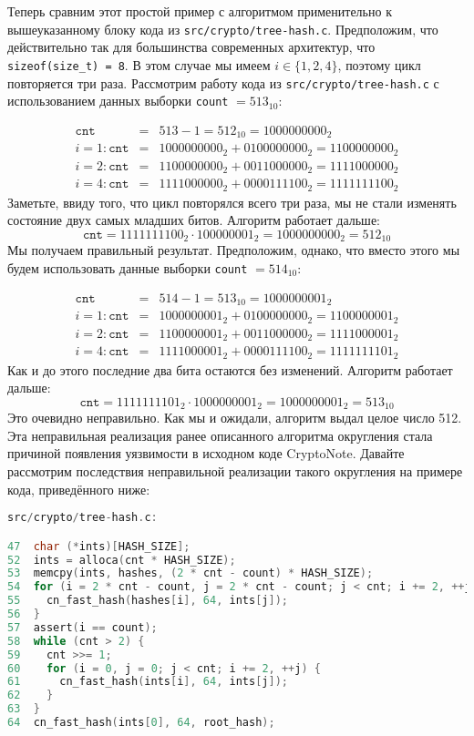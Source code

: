 \documentclass{mrl}
\begin{document}
Теперь сравним этот простой пример с алгоритмом применительно к вышеуказанному блоку кода из \texttt{src/crypto/tree-hash.c}. Предположим, что действительно так для большинства современных архитектур, что \texttt{sizeof(size\_t) = 8}. В этом случае мы имеем $i \in \{1,2,4\}$, поэтому цикл повторяется три раза. Рассмотрим работу кода из \texttt{src/crypto/tree-hash.c} с использованием данных выборки \texttt{count} $=513_{10}$:

\begin{eqnarray*}
\texttt{cnt}&=&513-1=512_{10}=1000000000_2 \\
i=1: \texttt{cnt} &=&1000000000_{2}+0100000000_{2}=1100000000_{2} \\
i=2: \texttt{cnt} &=&1100000000_{2}+0011000000_{2}=1111000000_{2} \\
i=4: \texttt{cnt} &=&1111000000_{2}+0000111100_{2}=1111111100_{2}
\end{eqnarray*}
Заметьте, ввиду того, что цикл повторялся всего три раза, мы не стали изменять состояние двух самых младших битов. Алгоритм работает дальше:
$$\texttt{cnt} =1111111100_{2} \cdot 100000001_{2}=1000000000_{2}=512_{10}$$
Мы получаем правильный результат. Предположим, однако, что вместо этого мы будем использовать данные выборки \texttt{count} $=514_{10}$:

\begin{eqnarray*}
\texttt{cnt}&=&514-1=513_{10}=1000000001_2 \\
i=1:\texttt{cnt}&=&1000000001_{2}+0100000000_{2}=1100000001_{2} \\
i=2:\texttt{cnt}&=&1100000001_{2}+0011000000_{2}=1111000001_{2} \\
i=4:\texttt{cnt}&=&1111000001_{2}+0000111100_{2}=1111111101_{2}
\end{eqnarray*}
Как и до этого последние два бита остаются без изменений. Алгоритм работает дальше:
$$\texttt{cnt} =1111111101_{2} \cdot 1000000001_{2}=1000000001_{2}=513_{10}$$
Это очевидно неправильно. Как мы и ожидали, алгоритм выдал целое число 512. Эта неправильная реализация ранее описанного алгоритма округления стала причиной появления уязвимости в исходном коде CryptoNote. Давайте рассмотрим последствия неправильной реализации такого округления на примере кода, приведённого ниже:

\begin{lstlisting}[language=C]
src/crypto/tree-hash.c:

47  char (*ints)[HASH_SIZE];
52  ints = alloca(cnt * HASH_SIZE);
53  memcpy(ints, hashes, (2 * cnt - count) * HASH_SIZE);
54  for (i = 2 * cnt - count, j = 2 * cnt - count; j < cnt; i += 2, ++j) {
55    cn_fast_hash(hashes[i], 64, ints[j]);
56  }
57  assert(i == count);
58  while (cnt > 2) {
59    cnt >>= 1;
60    for (i = 0, j = 0; j < cnt; i += 2, ++j) {
61      cn_fast_hash(ints[i], 64, ints[j]);
62    }
63  }
64  cn_fast_hash(ints[0], 64, root_hash);

\end{lstlisting}
\end{document}
